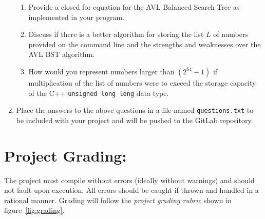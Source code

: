 \documentclass[10pt]{article}
\begin{document}
\begin{enumerate}
\begin{enumerate}
      \item Provide a closed for equation for the AVL Balanced Search Tree as implemented in your program.
      
      \item Discuss if there is a better algorithm for storing the list $L$ of numbers provided on the command line and the strengths and weaknesses over the AVL BST algorithm.
      
      \item How would you represent numbers larger than $(2^{64} - 1)$ if multiplication of the list of numbers were to exceed the storage capacity of the C++ \verb|unsigned long long| data type.
   \end{enumerate}

   \item Place the answers to the above questions in a file named \verb|questions.txt| to be included with your project and will be pushed to the GitLab repository.
		
\end{enumerate}

\newpage
\section*{Project Grading:}

The project must compile without errors (ideally without warnings) and should not fault upon execution. All errors should be caught if thrown and handled in a rational manner. Grading will follow the \emph{project grading rubric} shown in figure~\ref{fig:grading}.
\end{document}
